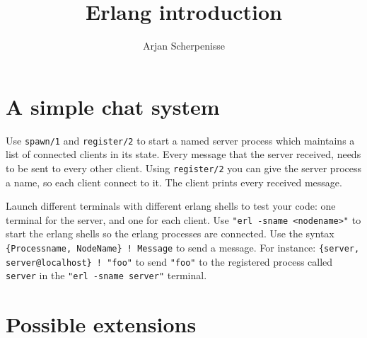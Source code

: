 \documentclass{article}
\begin{document}
\title{Erlang introduction}
\author{Arjan Scherpenisse}

\maketitle
\vspace*{2mm}

\section{A simple chat system}

Use {\tt spawn/1} and {\tt register/2} to start a named server process
which maintains a list of connected clients in its state.  Every
message that the server received, needs to be sent to every other
client. Using {\tt register/2} you can give the server process a name,
so each client  connect to it. The client prints every received
message.

Launch different terminals with different erlang shells to test your
code: one terminal for the server, and one for each client. Use {\tt "erl
-sname <nodename>"} to start the erlang shells so the erlang processes
are connected. Use the syntax {\tt \{Processname, NodeName\} ! Message} to
send a message. For instance: {\tt \{server, server@localhost\} ! "foo"} to send {\tt "foo"}
 to the registered process called {\tt server} in the {\tt "erl -sname server"}
terminal.

\section{Possible extensions}
\end{document}
